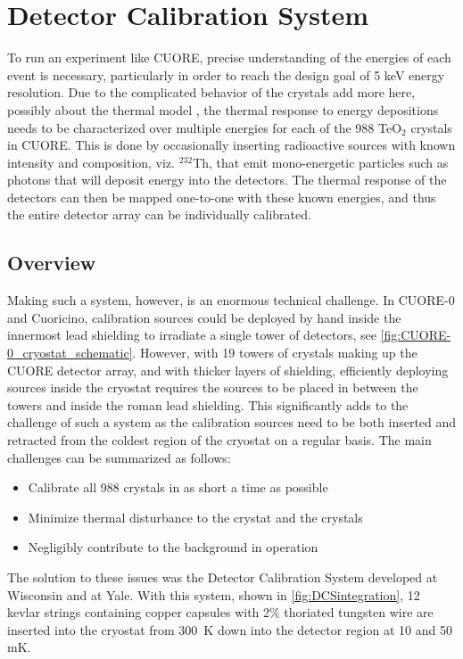 \chapter{Detector Calibration System}
\label{chap:DCS}

To run an experiment like CUORE, precise understanding of the energies of each event is necessary, particularly in order to reach the design goal of 5 keV energy resolution.
Due to the complicated behavior of the crystals \color{red} add more here, possibly about the thermal model \color{black}, the thermal response to energy depositions needs to be characterized over multiple energies for each of the 988 TeO$_2$ crystals in CUORE.
This is done by occasionally inserting radioactive sources with known intensity and composition, viz. $^{232}$Th, that emit mono-energetic particles such as photons that will deposit energy into the detectors.
The thermal response of the detectors can then be mapped one-to-one with these known energies, and thus the entire detector array can be individually calibrated.

\section{Overview}

Making such a system, however, is an enormous technical challenge.
In CUORE-0 and Cuoricino, calibration sources could be deployed by hand inside the innermost lead shielding to irradiate a single tower of detectors, see \autoref{fig:CUORE-0_cryostat_schematic}.
However, with 19 towers of crystals making up the CUORE detector array, and with thicker layers of shielding, efficiently deploying sources inside the cryostat requires the sources to be placed in between the towers and inside the roman lead shielding.
This significantly adds to the challenge of such a system as the calibration sources need to be both inserted and retracted from the coldest region of the cryostat on a regular basis.
The main challenges can be summarized as follows: 
\begin{itemize}
\item Calibrate all 988 crystals in as short a time as possible
\item Minimize thermal disturbance to the crystat and the crystals
\item Negligibly contribute to the background in operation
\end{itemize}

The solution to these issues was the Detector Calibration System developed at Wisconsin and at Yale.
With this system, shown in \autoref{fig:DCSintegration}, 12 kevlar strings containing copper capsules with 2\% thoriated tungsten wire are inserted into the cryostat from 300~K down into the detector region at 10 and 50 mK. 

